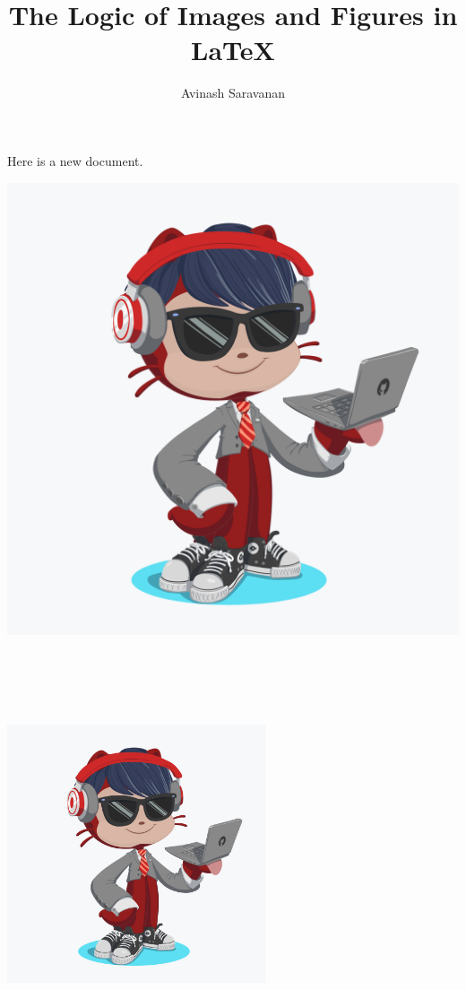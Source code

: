 \documentclass{article}
\author{Avinash Saravanan}
\title{The Logic of Images and Figures in {\LaTeX}}
\begin{document}
\maketitle

Here is a new document.

\begin{center}
\includegraphics[width=\textwidth]{octocat.png}
\includegraphics[width=3in, height=5in, keepaspectratio, angle=43]{octocat.png}
\end{center}
\end{document}
